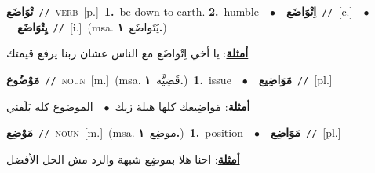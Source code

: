 \documentclass[10pt,a4paper,twoside]{article} %
\begin{document}
\begin{multicols}{2}
{\setlength\topsep{0pt}\textbf{\foreignlanguage{arabic}{تْوَاضَع}}\ {\color{gray}\texttt{//}\color{black}}\ \textsc{verb}\ [p.]\ \textbf{1.}~be down to earth.  \textbf{2.}~humble\ \ $\bullet$\ \ \setlength\topsep{0pt}\textbf{\foreignlanguage{arabic}{اِتْوَاضَع}}\ {\color{gray}\texttt{//}\color{black}}\ [c.]\ \ $\bullet$\ \ \setlength\topsep{0pt}\textbf{\foreignlanguage{arabic}{يِتْوَاضَع}}\ {\color{gray}\texttt{//}\color{black}}\ [i.]\ \color{gray}(msa. \foreignlanguage{arabic}{يَتَواضَع}~\foreignlanguage{arabic}{\textbf{١.}})\color{black}\  \begin{flushright}\color{gray}\foreignlanguage{arabic}{\textbf{\underline{\foreignlanguage{arabic}{أمثلة}}}: يا أخي اِتْواضَع مع الناس عشان ربنا يرفع قيمتك}\end{flushright}\color{black}} \vspace{2mm}

{\setlength\topsep{0pt}\textbf{\foreignlanguage{arabic}{مَوْضُوع}}\ {\color{gray}\texttt{//}\color{black}}\ \textsc{noun}\ [m.]\ \color{gray}(msa. \foreignlanguage{arabic}{قَضِيَّة}~\foreignlanguage{arabic}{\textbf{١.}})\color{black}\ \textbf{1.}~issue\ \ $\bullet$\ \ \setlength\topsep{0pt}\textbf{\foreignlanguage{arabic}{مَوَاضِيع}}\ {\color{gray}\texttt{//}\color{black}}\ [pl.]\  \begin{flushright}\color{gray}\foreignlanguage{arabic}{\textbf{\underline{\foreignlanguage{arabic}{أمثلة}}}: مَواضِيعك كلها هبلة زيك\ $\bullet$\ \  الموضوع كله بَلَفني}\end{flushright}\color{black}} \vspace{2mm}

{\setlength\topsep{0pt}\textbf{\foreignlanguage{arabic}{مَوْضِع}}\ {\color{gray}\texttt{//}\color{black}}\ \textsc{noun}\ [m.]\ \color{gray}(msa. \foreignlanguage{arabic}{موضِع}~\foreignlanguage{arabic}{\textbf{١.}})\color{black}\ \textbf{1.}~position\ \ $\bullet$\ \ \setlength\topsep{0pt}\textbf{\foreignlanguage{arabic}{مَوَاضِع}}\ {\color{gray}\texttt{//}\color{black}}\ [pl.]\  \begin{flushright}\color{gray}\foreignlanguage{arabic}{\textbf{\underline{\foreignlanguage{arabic}{أمثلة}}}: احنا هلا بموضِع شبهة والرد مش الحل الأفضل}\end{flushright}\color{black}} \vspace{2mm}


\end{multicols}
\end{document}
